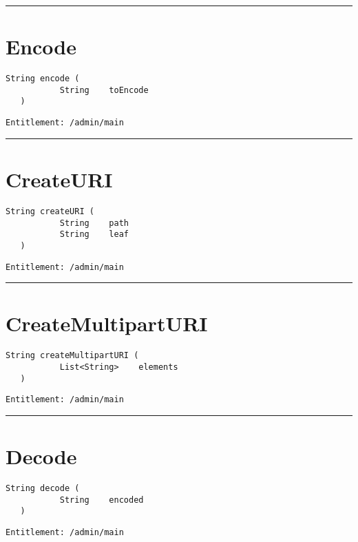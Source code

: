 \rule{12cm}{2pt}
\section{Encode}
\label{Api:Encode}
\begin{lstlisting}[style=nonumbers]
   String encode (
           String    toEncode
   )
\end{lstlisting}
\begin{Verbatim}[formatcom=\color{Maroon}]
  Entitlement: /admin/main
\end{Verbatim}



\rule{12cm}{2pt}
\section{CreateURI}
\label{Api:CreateURI}
\begin{lstlisting}[style=nonumbers]
   String createURI (
           String    path
           String    leaf
   )
\end{lstlisting}
\begin{Verbatim}[formatcom=\color{Maroon}]
  Entitlement: /admin/main
\end{Verbatim}



\rule{12cm}{2pt}
\section{CreateMultipartURI}
\label{Api:CreateMultipartURI}
\begin{lstlisting}[style=nonumbers]
   String createMultipartURI (
           List<String>    elements
   )
\end{lstlisting}
\begin{Verbatim}[formatcom=\color{Maroon}]
  Entitlement: /admin/main
\end{Verbatim}



\rule{12cm}{2pt}
\section{Decode}
\label{Api:Decode}
\begin{lstlisting}[style=nonumbers]
   String decode (
           String    encoded
   )
\end{lstlisting}
\begin{Verbatim}[formatcom=\color{Maroon}]
  Entitlement: /admin/main
\end{Verbatim}



